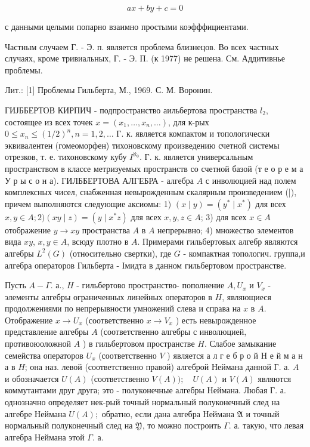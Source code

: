 \documentclass[10pt]{article}
\begin{document}
\[

a x+b y+c=0

\]



с данными целыми попарно взаимно простыми коэфффициентами.



Частным случаем Г. - Э. п. является проблема близнецов. Во всех частных случаях, кроме тривиальных, Г. - Э. П. (к 1977) не решена. См. Аддитивнье проблемы.



Лит.: [1] Проблемы Гильберта, М., 1969. С. М. Воронин.



ГИЈББЕРТОВ КИРПИЧ - подпространство аильбертова пространства $l_{2}$, состоящее из всех точек $x=\left(x_{1}, \ldots, x_{n}, \ldots\right)$, для к-рых $0 \leqslant x_{n} \leqslant(1 / 2)^{n}, n=1,2, \ldots$ Г. к. является компактом и топологически эквивалентен (гомеоморфен) тихоновскому произведению счетной системы отрезков, т. е. тихоновскому кубу $I^{\aleph_{0}}$. Г. к. является универсальным пространством в классе метризуемых пространств со счетной базой (т е о р е м а У р ы с о н а). ГИЛББЕРТОВА АЛГЕБРА - алгебра $A$ с инволюцией над полем комплексных чисел, снабженная невырожденным скалярным произведением (|), причем выполняются следующие аксиомы: 1) $(x \mid y)=\left(y^{*} \mid x^{*}\right)$ для всех $x, y \in A ; 2)(x y \mid z)=\left(y \mid x^{*} z\right)$ для всех $x, y, z \in A$; 3) для всех $x \in A$ отображение $y \rightarrow x y$ пространства $A$ в $A$ непрерывно; 4) множество элементов вида $x y$, $x, y \in A$, всюду плотно в $A$. Примерами гильбертовых алгебр являются алгебры $L^{2}(G)$ (относительно свертки), где $G$ - компактная топологич. группа,и алгебра операторов Гильберта - Імидта в данном гильбертовом пространстве.



Пусть $A-\Gamma$. а., $H$ - гильбертово пространство- пополнение $A, U_{x}$ и $V_{x}$ - элементы алгебры ограниченных линейных операторов в $H$, являющиеся продолжениями по непрерывности умножений слева и справа на $x$ в $A$. Отображение $x \rightarrow U_{x}$ (соответственно $x \rightarrow V_{x}$ ) есть невырожденное представление алгебры $A$ (соответственно алгебры с инволюцией, противоюоложной $A$ ) в гильбертовом пространстве $H$. Слабое замыкание семейства операторов $U_{x}$ (соответственно $V$ ) является а л г е б р о й $\mathrm{H}$ е й м а н а в $H$; она наз. левой (соответственно правой) алгеброй Неймана данной Г. а. $A$ и обозначается $U(A)$ (соответственно $V(A)) ; \quad U(A)$ и $V(A)$ являются коммутантами друг друга; это - полуконечные алгебры Неймана. Любая Г. а. однозначно определяет нек-рый точный нормальный полуконечный след на алгебре Неймана $U(A) ;$ обратно, если дана алгебра Неймана $\mathfrak{A}$ и точный нормальный полуконечный след на $\mathfrak{Y}$, то можно построить $\Gamma$. а. такую, что левая алгебра Неймана этой $\Gamma$. а.
\end{document}
